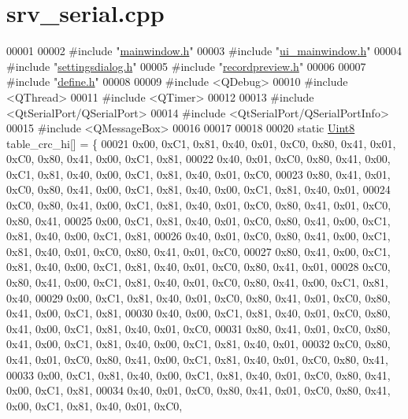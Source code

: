 \hypertarget{a00050_source}{\section{srv\+\_\+serial.\+cpp}
\label{a00050_source}
}

\begin{DoxyCode}
00001 
00002 \textcolor{preprocessor}{#include "\hyperlink{a00039}{mainwindow.h}"}
00003 \textcolor{preprocessor}{#include "\hyperlink{a00052}{ui\_mainwindow.h}"}
00004 \textcolor{preprocessor}{#include "\hyperlink{a00045}{settingsdialog.h}"}
00005 \textcolor{preprocessor}{#include "\hyperlink{a00043}{recordpreview.h}"}
00006 
00007 \textcolor{preprocessor}{#include "\hyperlink{a00034}{define.h}"}
00008 
00009 \textcolor{preprocessor}{#include <QDebug>}
00010 \textcolor{preprocessor}{#include <QThread>}
00011 \textcolor{preprocessor}{#include <QTimer>}
00012 
00013 \textcolor{preprocessor}{#include <QtSerialPort/QSerialPort>}
00014 \textcolor{preprocessor}{#include <QtSerialPort/QSerialPortInfo>}
00015 \textcolor{preprocessor}{#include <QMessageBox>}
00016 
00017 
00018 
00020 \textcolor{keyword}{static} \hyperlink{a00001_a979e3e23b9a449e69ab6a8a83b6042f8}{Uint8} table\_crc\_hi[] = \{
00021 0x00, 0xC1, 0x81, 0x40, 0x01, 0xC0, 0x80, 0x41, 0x01, 0xC0, 0x80, 0x41, 0x00, 0xC1, 0x81,
00022 0x40, 0x01, 0xC0, 0x80, 0x41, 0x00, 0xC1, 0x81, 0x40, 0x00, 0xC1, 0x81, 0x40, 0x01, 0xC0,
00023 0x80, 0x41, 0x01, 0xC0, 0x80, 0x41, 0x00, 0xC1, 0x81, 0x40, 0x00, 0xC1, 0x81, 0x40, 0x01,
00024 0xC0, 0x80, 0x41, 0x00, 0xC1, 0x81, 0x40, 0x01, 0xC0, 0x80, 0x41, 0x01, 0xC0, 0x80, 0x41,
00025 0x00, 0xC1, 0x81, 0x40, 0x01, 0xC0, 0x80, 0x41, 0x00, 0xC1, 0x81, 0x40, 0x00, 0xC1, 0x81,
00026 0x40, 0x01, 0xC0, 0x80, 0x41, 0x00, 0xC1, 0x81, 0x40, 0x01, 0xC0, 0x80, 0x41, 0x01, 0xC0,
00027 0x80, 0x41, 0x00, 0xC1, 0x81, 0x40, 0x00, 0xC1, 0x81, 0x40, 0x01, 0xC0, 0x80, 0x41, 0x01,
00028 0xC0, 0x80, 0x41, 0x00, 0xC1, 0x81, 0x40, 0x01, 0xC0, 0x80, 0x41, 0x00, 0xC1, 0x81, 0x40,
00029 0x00, 0xC1, 0x81, 0x40, 0x01, 0xC0, 0x80, 0x41, 0x01, 0xC0, 0x80, 0x41, 0x00, 0xC1, 0x81,
00030 0x40, 0x00, 0xC1, 0x81, 0x40, 0x01, 0xC0, 0x80, 0x41, 0x00, 0xC1, 0x81, 0x40, 0x01, 0xC0,
00031 0x80, 0x41, 0x01, 0xC0, 0x80, 0x41, 0x00, 0xC1, 0x81, 0x40, 0x00, 0xC1, 0x81, 0x40, 0x01,
00032 0xC0, 0x80, 0x41, 0x01, 0xC0, 0x80, 0x41, 0x00, 0xC1, 0x81, 0x40, 0x01, 0xC0, 0x80, 0x41,
00033 0x00, 0xC1, 0x81, 0x40, 0x00, 0xC1, 0x81, 0x40, 0x01, 0xC0, 0x80, 0x41, 0x00, 0xC1, 0x81,
00034 0x40, 0x01, 0xC0, 0x80, 0x41, 0x01, 0xC0, 0x80, 0x41, 0x00, 0xC1, 0x81, 0x40, 0x01, 0xC0,

\end{DoxyCode}
